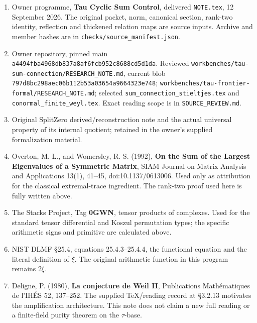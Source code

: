 \begin{enumerate}
\def\labelenumi{\arabic{enumi}.}
\tightlist
\item
  Owner programme, \textbf{Tau Cyclic Sum Control}, delivered
  \nolinkurl{NOTE.tex}, 12 September 2026. The original packet, norm,
  canonical section, rank-two identity, reflection and thickened
  relation maps are source inputs. Archive and member hashes are in
  \nolinkurl{checks/source_manifest.json}.
\item
  Owner repository, pinned main
  \nolinkurl{a4494fba4968db837a8af6fcb952c8688cd5d1da}. Reviewed
  \nolinkurl{workbenches/tau-sum-connection/RESEARCH_NOTE.md}, current
  blob \nolinkurl{797d8bc298aec06b112b53a03654a9664323e748};
  \nolinkurl{workbenches/tau-frontier-formal/RESEARCH_NOTE.md}; selected
  \nolinkurl{sum_connection_stieltjes.tex} and
  \nolinkurl{conormal_finite_weyl.tex}. Exact reading scope is in
  \nolinkurl{SOURCE_REVIEW.md}.
\item
  Original SplitZero derived/reconstruction note and the actual
  universal property of its internal quotient; retained in the owner's
  supplied formalization material.
\item
  Overton, M. L., and Womersley, R. S. (1992), \textbf{On the Sum of the
  Largest Eigenvalues of a Symmetric Matrix}, SIAM Journal on Matrix
  Analysis and Applications 13(1), 41--45, doi:10.1137/0613006. Used
  only as attribution for the classical extremal-trace ingredient. The
  rank-two proof used here is fully written above.
\item
  The Stacks Project, Tag \textbf{0GWN}, tensor products of complexes.
  Used for the standard tensor differential and Koszul permutation
  types; the specific arithmetic signs and primitive are calculated
  above.
\item
  NIST DLMF §25.4, equations 25.4.3--25.4.4, the functional equation and
  the literal definition of \(\xi\). The original arithmetic function in
  this program remains \(2\xi\).
\item
  Deligne, P. (1980), \textbf{La conjecture de Weil II}, Publications
  Mathématiques de l'IHÉS 52, 137--252. The supplied TeX/reading record
  at §3.2.13 motivates the amplification architecture. This note does
  not claim a new full reading or a finite-field purity theorem on the
  \(\tau\)-base.
\end{enumerate}

